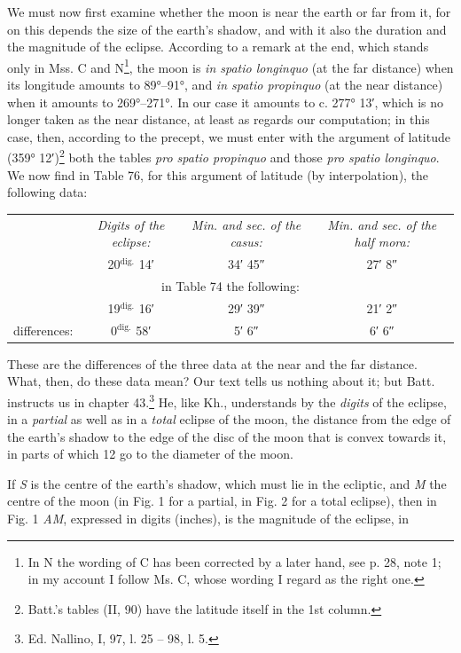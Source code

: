\documentclass[11pt]{article}
\newcommand{\Pg}[1]{\marginpar{\footnotesize\color{gray}#1}}
\begin{document}
\par We must now first examine whether the moon is near the earth or far from it, for on this depends the size of the earth's shadow, and with it also the duration and the magnitude of the eclipse. According to a remark at the end, which stands only in Mss. C and N\footnote{In N the wording of C has been corrected by a later hand, see p. 28, note 1; in my account I follow Ms. C, whose wording I regard as the right one.}, the moon is \emph{in spatio longinquo} (at the far distance) when its longitude amounts to 89°–91°, and \emph{in spatio propinquo} (at the near distance) when it amounts to 269°–271°. In our case it amounts to c. 277° 13′, which is no longer taken as the near distance, at least as regards our computation; in this case, then, according to the precept, we must enter with the argument of latitude (359° 12′)\footnote{Batt.'s tables (II, 90) have the latitude itself in the 1st column.} both the tables \emph{pro spatio propinquo} and those \emph{pro spatio longinquo}. We now find in Table 76, for this argument of latitude (by interpolation), the following data:\par
\Pg{87}\begin{center}\small\begin{tabular}{lccc}
 & \emph{Digits of the eclipse:} & \emph{Min. and sec. of the casus:} & \emph{Min. and sec. of the half mora:} \\
 & 20$^{\text{dig.}}$ 14′ & 34′ 45″ & 27′ 8″ \\
\multicolumn{4}{c}{in Table 74 the following:} \\
 & 19$^{\text{dig.}}$ 16′ & 29′ 39″ & 21′ 2″ \\
differences: & 0$^{\text{dig.}}$ 58′ & 5′ 6″ & 6′ 6″ \\
\end{tabular}\end{center}
\par These are the differences of the three data at the near and the far distance. What, then, do these data mean? Our text tells us nothing about it; but Batt. instructs us in chapter 43.\footnote{Ed. Nallino, I, 97, l. 25 – 98, l. 5.} He, like Kh., understands by the \emph{digits} of the eclipse, in a \emph{partial} as well as in a \emph{total} eclipse of the moon, the distance from the edge of the earth's shadow to the edge of the disc of the moon that is convex towards it, in parts of which 12 go to the diameter of the moon.\par
\par If \emph{S} is the centre of the earth's shadow, which must lie in the ecliptic, and \emph{M} the centre of the moon (in Fig. 1 for a partial, in Fig. 2 for a total eclipse), then in Fig. 1 \emph{AM}, expressed in digits (inches), is the magnitude of the eclipse, in\par
\end{document}
